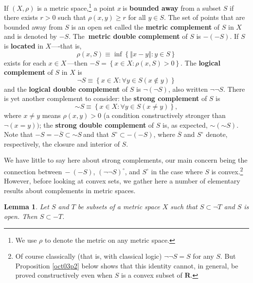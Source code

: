 \documentclass[11pt]{article}%
\newtheorem{lemma}[theorem]{Lemma}
\begin{document}
If $\left(  X,\rho\right)  $ is a metric space,\footnote{%
\normalfont\sf
We use $\rho$ to denote the metric on any metric space.} a point $x\ $is
\textbf{bounded away} from a subset $S$ if there exists $r>0$ such that
$\rho(x,y)\geq r$ for all $y\in S$. The set of points that are bounded away
from $S$ is an open set called the \textbf{metric complement }of $S$ in $X$
and is denoted by $-S$. The\textbf{\ metric double complement} of $S$ is
$-(-S)$. If $S$ is \textbf{located} in $X$----that is,%
\[
\rho(x,S)\equiv\inf\left\{  \left\Vert x-y\right\Vert :y\in S\right\}
\]
exists for each $x\in X\,$---then $-S=\left\{  x\in X:\rho(x,S)>0\right\}  $.
The \textbf{logical complement }of $S$ in $X$ is\textbf{\ }%
\[
\lnot S\equiv\left\{  x\in X:\forall y\in S(x\notin y)\right\}
\]
and the \textbf{logical double complement} of $S$ is $\lnot(\lnot S)$, also
written $\lnot\lnot S$. There is yet another complement to consider: the
\textbf{strong complement }of $S$ is%
\[%
\mathord{\sim}%
S\equiv\left\{  x\in X:\forall y\in S(x\neq y)\right\}  ,
\]
where $x\neq y$ means $\rho(x,y)>0$ (a condition constructively stronger than
$\lnot(x=y))$; the \textbf{strong double complement} of $S$ is, as expected, $%
\mathord{\sim}%
(%
\mathord{\sim}%
S)$. Note that $-S=-\overline{S}\subset%
\mathord{\sim}%
S\ $and that $S^{\circ}\subset-(-S)$, where $\overline{S}$ and $S^{\circ}$
denote, respectively, the closure and interior of $S$.

We have little to say here about strong complements, our main concern being
the connection between$\ -(-S)$, $\left(  \lnot\lnot S\right)  ^{\circ}$, and
$S^{\circ}$ in the case where $S$ is convex.\footnote{%
\normalfont\sf
Of course classically (that is, with classical logic) $\lnot\lnot S=S$ for any
$S$. But Proposition \ref{oct03p2} below shows that this identity cannot, in
general, be proved constructively even when $S$ is a convex subset of
$\mathbf{R}$.} However, before looking at convex sets, we gather here a number
of elementary results about complements in metric spaces.

\begin{lemma}
\label{oct14l1}Let $S$ and $T$ be subsets of a metric space $X$ such that
$S\subset\lnot T$ and $S$ is open. Then $S\subset-T$.
\end{lemma}
\end{document}
